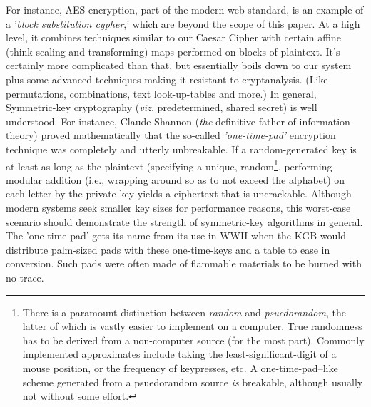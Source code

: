 \documentclass[11pt,a4paper]{article}
\begin{document}
  For instance, AES encryption, part of the modern web standard, is an example of a '\textit{block substitution cypher},' which are beyond the scope of this paper. %
At a high level, it combines techniques similar to our Caesar Cipher with certain affine (think scaling and transforming) maps performed on blocks of plaintext. It's certainly more complicated than that, but essentially boils down to our system plus some advanced techniques making it resistant to cryptanalysis. (Like permutations, combinations, text look-up-tables and more.) In general, Symmetric-key cryptography (\textit{viz.} predetermined, shared secret) is well understood. For instance, Claude Shannon (\textit{the} definitive father of information theory) proved mathematically that the so-called \textit{'one-time-pad'} encryption technique was completely and utterly unbreakable. 
If a random-generated key is at least as long as the plaintext (specifying a unique, random\footnote{There is a paramount distinction between \textit{random} and \textit{psuedorandom}, the latter of which is vastly easier to implement on a computer. True randomness has to be derived from a non-computer source (for the most part). Commonly implemented approximates include taking the least-significant-digit of a mouse position, or the frequency of keypresses, etc. A one-time-pad–like scheme generated from a psuedorandom source \textit{is} breakable, although usually not without some effort.}, performing modular addition (i.e., wrapping around so as to not exceed the alphabet) on each letter by the private key yields a ciphertext that is uncrackable.\autocite{claude} Although modern systems seek smaller key sizes for performance reasons, this worst-case scenario should demonstrate the strength of symmetric-key algorithms in general. The 'one-time-pad' gets its name from its use in WWII when the KGB would distribute palm-sized pads with these one-time-keys and a table to ease in conversion. Such pads were often made of flammable materials to be burned with no trace.\autocite{lewand} 
  
\end{document}

